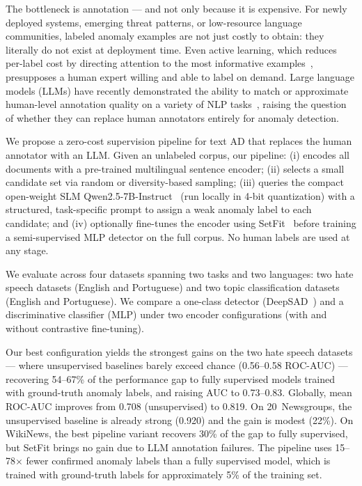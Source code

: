 \documentclass[12pt]{article}
\begin{document}
The bottleneck is annotation --- and not only because it is expensive.
For newly deployed systems, emerging threat patterns, or low-resource language
communities, labeled anomaly examples are not just costly to obtain: they
literally do not exist at deployment time. Even active learning, which reduces
per-label cost by directing attention to the most informative
examples~\cite{settles2009active}, presupposes a human expert willing and
able to label on demand. Large language models (LLMs) have recently 
demonstrated the ability to match or approximate human-level annotation quality 
on a variety of NLP tasks~\cite{wang2021want, he2023annollm}, raising the question 
of whether they can replace human annotators entirely for anomaly detection.

We propose a zero-cost supervision pipeline for text AD that replaces the human 
annotator with an LLM. Given an unlabeled corpus, our pipeline: (i) encodes all 
documents with a pre-trained multilingual sentence encoder; (ii) selects a 
small candidate set via random or diversity-based sampling; (iii) queries the 
compact open-weight SLM Qwen2.5-7B-Instruct~\cite{qwen2025} (run locally in
4-bit quantization) with a structured,
task-specific prompt to assign a weak anomaly label to each candidate; and (iv) optionally 
fine-tunes the encoder using SetFit~\cite{tunstall2022efficient} before training a 
semi-supervised MLP detector on the full corpus. No human labels are used at any 
stage.

We evaluate across four datasets spanning two tasks and two languages:
two hate speech datasets (English and Portuguese) and two topic classification
datasets (English and Portuguese). We compare a one-class detector
(DeepSAD~\cite{Ruff2019}) and a discriminative classifier (MLP) under two
encoder configurations (with and without contrastive fine-tuning). 

Our best configuration yields the strongest gains on the two hate speech
datasets --- where unsupervised baselines barely exceed chance
(0.56--0.58 ROC-AUC) --- recovering 54--67\% of the performance gap to 
fully supervised models trained with ground-truth anomaly labels, and raising AUC to 0.73--0.83.
Globally, mean ROC-AUC improves from 0.708 (unsupervised) to 0.819. On 20~Newsgroups, the unsupervised baseline is already strong (0.920) and the gain is modest (22\%). 
On WikiNews, the best pipeline variant recovers 30\% of the gap to fully supervised, but SetFit brings no gain due to LLM annotation failures. The pipeline uses 15--78$\times$ fewer confirmed anomaly labels than a fully supervised model, 
which is trained with ground-truth labels for approximately 5\% of the training set. 
\end{document}
